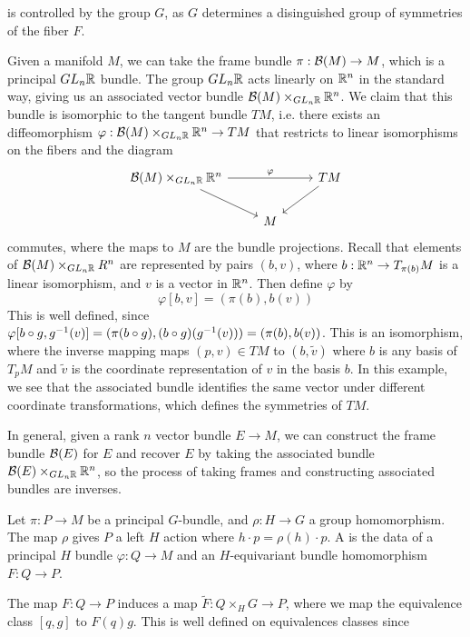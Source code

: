 is controlled by the group $G$, as $G$ determines a disinguished
group of symmetries of the fiber $F$.
%
\begin{exmp}
Given a manifold $M$, we can take the frame bundle $\pi : \mathcal{B}(M) \to M$, which is a
principal $GL_n\mathbb{R}$ bundle. The group $GL_n\mathbb{R}$ acts linearly on $\mathbb{R}^n$ in the
standard way, giving us an associated vector bundle $\mathcal{B}(M) \times_{GL_n\mathbb{R}} \mathbb{R}^n$.
We claim that this bundle is isomorphic to the tangent bundle $TM$, i.e. there
exists an diffeomorphism $\varphi : \mathcal{B}(M) \times_{GL_n\mathbb{R}} \mathbb{R}^n \to TM$ that
restricts to linear isomorphisms on the fibers and the diagram
\[\begin{tikzcd}
\B(M) \times_{GL_n\R} \R^n \ar[rr, "\varphi"] \ar[dr] && TM \ar[dl] \\
& M
\end{tikzcd}\]
commutes, where the maps to $M$ are the bundle projections. Recall that
elements of $\mathcal{B}(M) \times_{GL_n\mathbb{R}} R^n$ are represented by pairs $(b, v)$,
where $b: \mathbb{R}^n \to T_{\pi(b)}M$ is a linear isomorphism, and $v$ is a vector in $\mathbb{R}^n$.
Then define $\varphi$ by
\[
\varphi[b,v] = (\pi(b), b(v))
\]
This is well defined, since $\varphi[b\circ g, g^{-1}(v)] = (\pi(b \circ g),
(b\circ g)(g^{-1}(v))) = (\pi(b), b(v))$. This is an isomorphism, where the
inverse mapping maps $(p,v) \in TM$ to $(b, \tilde{v})$ where $b$ is any
basis of $T_pM$ and $\tilde{v}$ is the coordinate representation of $v$ in the
basis $b$. In this example, we see that the associated bundle identifies the same vector
under different coordinate transformations, which defines the symmetries of
$TM$.
\end{exmp}
%
In general, given a rank $n$ vector bundle $E \to M$, we can construct the
frame bundle  $\mathcal{B}(E)$ for $E$ and recover $E$ by taking the associated bundle
$\mathcal{B}(E) \times_{GL_n\mathbb{R}} \mathbb{R}^n$, so the process of taking frames and constructing
associated bundles are inverses.
%
\begin{defn}
Let $\pi : P \to M$ be a principal $G$-bundle, and $\rho : H \to G$ a group
homomorphism. The map $\rho$ gives $P$ a left $H$ action where
$h \cdot p = \rho(h) \cdot p$. A  is the
data of a principal $H$ bundle $\varphi : Q \to M$ and an $H$-equivariant bundle
homomorphism $F : Q \to P$.
\end{defn}
%
The map $F : Q \to P$ induces a map $\tilde{F} : Q \times_H G \to P$, where we
map the equivalence class $[q,g]$ to $F(q) g$. This is well defined
on equivalences classes since
